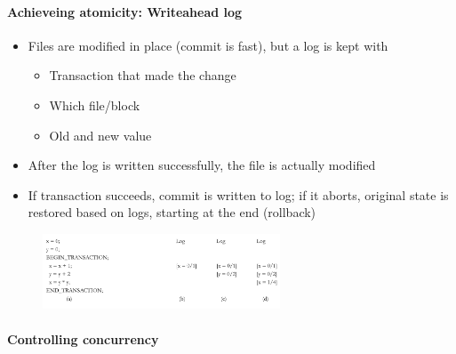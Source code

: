 \documentclass[10pt,a4paper]{article}
\newcommand{\myparagraph}[1]{\paragraph{#1}\mbox{}\\[0.05in]}
\begin{document}
\paragraph{Achieveing atomicity: Writeahead log}
\begin{itemize}
	\item Files are modified in place (commit is fast), but a log is kept with
	\begin{itemize}
		\item Transaction that made the change
		\item Which file/block
		\item Old and new value
	\end{itemize}
	\item After the log is written successfully, the file is actually modified
	\item If transaction succeeds, commit is written to log; if it aborts, original state is restored based on logs, starting at the end (rollback)
\end{itemize}
\begin{figure}[h!]
 \hfill \includegraphics[width=200pt]{images/writeahead.png}\hspace*{\fill}
  \label{fig:writeahead}
\end{figure} \pagebreak
\myparagraph{Controlling concurrency}
\end{document}
